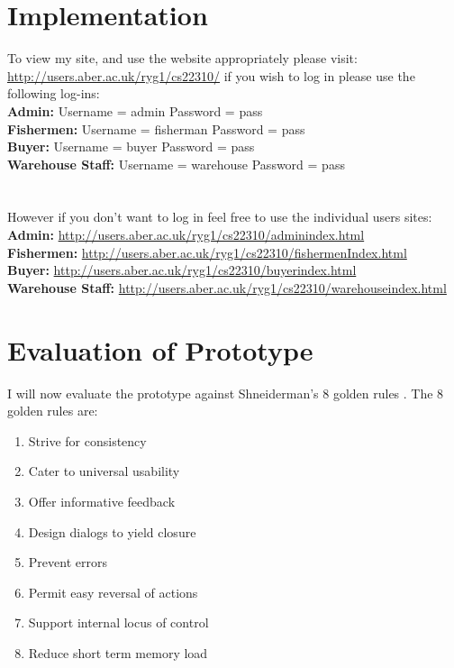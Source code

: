 \documentclass{article}
\begin{document}
\section{Implementation}
To view my site, and use the website appropriately please visit:
\url{http://users.aber.ac.uk/ryg1/cs22310/} if you wish to log in please use the following log-ins: \\
\textbf{Admin:} Username = admin Password = pass \\ 
\textbf{Fishermen:} Username = fisherman Password = pass \\ 
\textbf{Buyer:} Username = buyer Password = pass \\ 
\textbf{Warehouse Staff:} Username = warehouse Password = pass \\ 
\\ \\
However if you don't want to log in feel free to use the individual users sites: \\
\textbf{Admin:}  \url{http://users.aber.ac.uk/ryg1/cs22310/adminindex.html} \\
\textbf{Fishermen:} \url{http://users.aber.ac.uk/ryg1/cs22310/fishermenIndex.html} \\
\textbf{Buyer: } \url{http://users.aber.ac.uk/ryg1/cs22310/buyerindex.html} \\
\textbf{Warehouse Staff:} \url{http://users.aber.ac.uk/ryg1/cs22310/warehouseindex.html}
\section{Evaluation of Prototype}
I will now evaluate the prototype against Shneiderman’s 8 golden rules \cite{rules}. 
The 8 golden rules are: 
\begin{enumerate}
 \item Strive for consistency
\item Cater to universal usability
\item  Offer informative feedback
\item  Design dialogs to yield closure
\item Prevent errors
\item Permit easy reversal of actions
\item Support internal locus of control
\item Reduce short term memory load
\end{enumerate}
\end{document}
